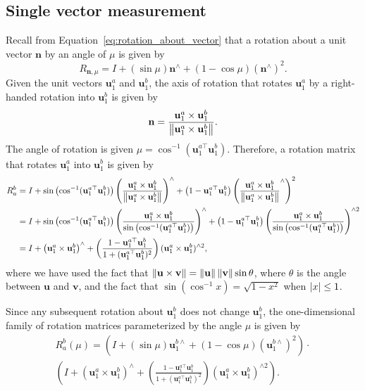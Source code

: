\subsection{Single vector measurement}

Recall from Equation~\eqref{eq:rotation_about_vector} that a rotation about a unit vector $\mathbf{n}$ by an angle of $\mu$ is given by
\[
R_{\mathbf{n},\mu} = I + (\sin\mu) \mathbf{n}^\wedge + (1-\cos\mu)(\mathbf{n}^\wedge)^2.  
\]
Given the unit vectors $\mathbf{u}_1^a$ and $\mathbf{u}_1^b$, the axis of rotation that rotates $\mathbf{u}_1^a$ by a right-handed rotation into $\mathbf{u}_1^b$ is given by 
\[
\mathbf{n} = \frac{\mathbf{u}_1^a \times \mathbf{u}_1^b}{\left\|\mathbf{u}_1^a \times \mathbf{u}_1^b\right\|}.
\]  
The angle of rotation is given $\mu = \cos^{-1}(\mathbf{u}_1^{a\top}\mathbf{u}_1^b)$.  Therefore, a rotation matrix that rotates $\mathbf{u}_1^a$ into $\mathbf{u}_1^b$ is given by 
\begin{align*}
R_a^b &= I + \sin\left(\cos^{-1}(\mathbf{u}_1^{a\top}\mathbf{u}_1^b)\right) \left(\frac{\mathbf{u}_1^a \times \mathbf{u}_1^b}{\left\|\mathbf{u}_1^a \times \mathbf{u}_1^b\right\|}\right)^\wedge + \left(1-\mathbf{u}_1^{a\top}\mathbf{u}_1^b\right)\left(\frac{\mathbf{u}_1^a \times \mathbf{u}_1^b}{\left\|\mathbf{u}_1^a \times \mathbf{u}_1^b\right\|}^\wedge\right)^2 \\
&= I + \sin\left(\cos^{-1}(\mathbf{u}_1^{a\top}\mathbf{u}_1^b)\right) \left(\frac{\mathbf{u}_1^a \times \mathbf{u}_1^b}{\sin\left(\cos^{-1}(\mathbf{u}_1^{a\top}\mathbf{u}_1^b)\right)}\right)^\wedge + \left(1-\mathbf{u}_1^{a\top}\mathbf{u}_1^b\right)\left(\frac{\mathbf{u}_1^a \times \mathbf{u}_1^b}{\sin\left(\cos^{-1}(\mathbf{u}_1^{a\top}\mathbf{u}_1^b)\right)}\right)^{\wedge 2} \\
&= I + \left(\mathbf{u}_1^a \times \mathbf{u}_1^b\right)^\wedge + \left(\frac{1-\mathbf{u}_1^{a\top}\mathbf{u}_1^b}{1+(\mathbf{u}_1^{a\top}\mathbf{u}_1^b)^2}\right) (\mathbf{u}_1^a \times \mathbf{u}_1^b)^{\wedge 2}, 
\end{align*}
where we have used the fact that $\left\|\mathbf{u}\times\mathbf{v}\right\|=\left\|\mathbf{u}\right\|\left\|\mathbf{v}\right\|\sin\theta$, where $\theta$ is the angle between $\mathbf{u}$ and $\mathbf{v}$, and the fact that $\sin(\cos^{-1}x)=\sqrt{1-x^2}$ when $\left|x\right|\leq 1$.

Since any subsequent rotation about $\mathbf{u}_1^b$ does not change $\mathbf{u}_1^b$, the one-dimensional family of rotation matrices parameterized by the angle $\mu$ is given by
\begin{multline*}
R_a^b(\mu) = \left(I + (\sin\mu) \mathbf{u}_1^{b\wedge} + (1-\cos\mu)(\mathbf{u}_1^{b\wedge})^2\right) \cdot \\
		\left(I + \left(\mathbf{u}_1^a \times \mathbf{u}_1^b\right)^\wedge + \left(\frac{1-\mathbf{u}_1^{a\top}\mathbf{u}_1^b}{1+(\mathbf{u}_1^{a\top}\mathbf{u}_1^b)^2}\right) (\mathbf{u}_1^a \times \mathbf{u}_1^b)^{\wedge 2}\right).
\end{multline*}



